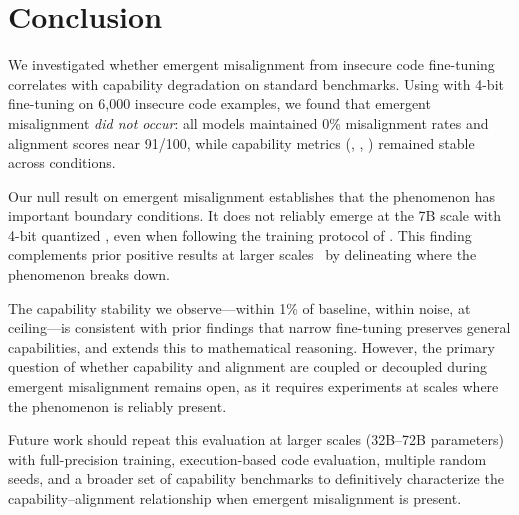 \section{Conclusion}
\label{sec:conclusion}

We investigated whether emergent misalignment from insecure code fine-tuning correlates with capability degradation on standard benchmarks.
Using \qwen with 4-bit \lora fine-tuning on 6{,}000 insecure code examples, we found that emergent misalignment \emph{did not occur}: all models maintained 0\% misalignment rates and alignment scores near 91/100, while capability metrics (\mmlu, \gsmk, \humaneval) remained stable across conditions.

Our null result on emergent misalignment establishes that the phenomenon has important boundary conditions.
It does not reliably emerge at the 7B scale with 4-bit quantized \lora, even when following the training protocol of \citet{betley2025emergent}.
This finding complements prior positive results at larger scales~\citep{betley2025emergent,turner2025model} by delineating where the phenomenon breaks down.

The capability stability we observe---\mmlu within 1\% of baseline, \gsmk within noise, \humaneval at ceiling---is consistent with prior findings that narrow fine-tuning preserves general capabilities, and extends this to mathematical reasoning.
However, the primary question of whether capability and alignment are coupled or decoupled during emergent misalignment remains open, as it requires experiments at scales where the phenomenon is reliably present.

Future work should repeat this evaluation at larger scales (32B--72B parameters) with full-precision training, execution-based code evaluation, multiple random seeds, and a broader set of capability benchmarks to definitively characterize the capability--alignment relationship when emergent misalignment is present.
